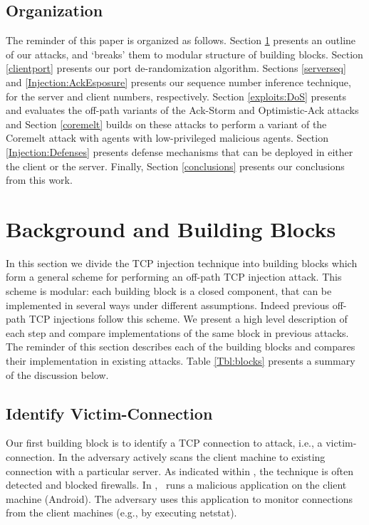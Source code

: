 \documentclass[conference]{IEEEtran}
\begin{document}
\subsection{Organization}
The reminder of this paper is organized as follows. Section \ref{background} presents an outline of our attacks, and `breaks' them to modular structure of building blocks. Section \ref{clientport} presents our port de-randomization algorithm. Sections \ref{serverseq} and  \ref{Injection:AckEsposure} presents our sequence number inference technique, for the server and client numbers, respectively. Section \ref{exploits:DoS} presents and evaluates the off-path variants of the Ack-Storm and Optimistic-Ack attacks and Section \ref{coremelt} builds on these attacks to perform a variant of the Coremelt attack with agents with low-privileged malicious agents. Section \ref{Injection:Defenses} presents defense mechanisms that can be deployed in either the client or the server. Finally, Section \ref{conclusions} presents our conclusions from this work.













\section{Background and Building Blocks} \label{background}

In this section we divide the TCP injection technique into building blocks which form a general scheme for performing an off-path TCP injection attack. This scheme is modular: each building block is a closed component, that can be implemented in several ways under different assumptions. Indeed previous off-path TCP injections \cite{woottcp,snptcp,lkm:phrack:07} follow this scheme. We present a high level description of each step and compare implementations of the same block in previous attacks. The reminder of this section describes each of the building blocks and compares their implementation in existing attacks. Table \ref{Tbl:blocks} presents a summary of the discussion below.


\subsection{Identify Victim-Connection} \label{establishconn}
Our first building block is to identify a TCP connection to attack, i.e., a victim-connection. In \cite{lkm:phrack:07} the adversary actively scans the client machine to existing connection with a particular server. As indicated within \cite{lkm:phrack:07}, the technique is often detected and blocked firewalls.
In \cite{snptcp}, \mal\ runs a malicious application on the client machine (Android). The adversary uses this application to monitor connections from the client machines (e.g., by executing netstat). 
\end{document}
